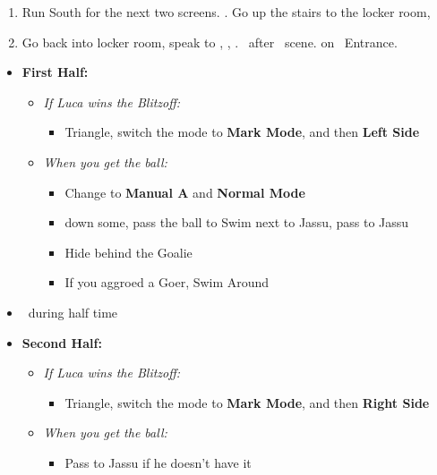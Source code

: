 \begin{enumerate}[resume]
    \item Run South for the next two screens. \save. Go up the stairs to the locker room, \sd
    \item Go back into locker room, speak to \wakka, \sd, \cs[1:20]. \sd\ after \lulu\ scene. \cs[1:40] on \auron\ Entrance.
\end{enumerate}
\bothvfill\winvfill\lossvfill
\begin{blitzball}
    \begin{itemize}
        \item \textbf{First Half:}
        \begin{itemize}
            \item \textit{If Luca wins the Blitzoff:}
            \begin{itemize}
                \item Triangle, switch the mode to \textbf{Mark Mode}, and then \textbf{Left Side}
            \end{itemize}
            \item \textit{When you get the ball:}
            \begin{itemize}
                \item Change to \textbf{Manual A} and \textbf{Normal Mode}
                \item down some, pass the ball to \tidus
                \tidusf Swim next to Jassu, pass to Jassu
                \item Hide behind the Goalie
                \item If you aggroed a Goer, Swim Around
            \end{itemize}
        \end{itemize}
        \item \sd\ during half time
        \item \textbf{Second Half:}
        \begin{itemize}
            \item \textit{If Luca wins the Blitzoff:}
            \begin{itemize}
                \item Triangle, switch the mode to \textbf{Mark Mode}, and then \textbf{Right Side}
            \end{itemize}
            \item \textit{When you get the ball:}
            \begin{itemize}
                \item Pass to Jassu if he doesn't have it

\end{itemize}
\end{itemize}
\end{itemize}
\end{blitzball}
